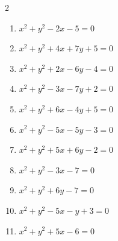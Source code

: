 \begin{multicols}{2}
\begin{enumerate}
  \item $x^{2}+y^{2}-2x-5=0$


  \item $x^{2}+y^{2}+4x+7y+5=0$


  \item $x^{2}+y^{2}+2x-6y-4=0$


  \item $x^{2}+y^{2}-3x-7y+2=0$


  \item $x^{2}+y^{2}+6x-4y+5=0$


  \item $x^{2}+y^{2}-5x-5y-3=0$


  \item $x^{2}+y^{2}+5x+6y-2=0$


  \item $x^{2}+y^{2}-3x-7=0$


  \item $x^{2}+y^{2}+6y-7=0$

        \phantom{$\displaystyle 中心\: \left(0,-3\right), \quad 半径 \ 4$}

  \item $x^{2}+y^{2}-5x-y+3=0$


\columnbreak %

  \item $x^{2}+y^{2}+5x-6=0$


\end{enumerate}
\end{multicols}
